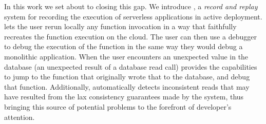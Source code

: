 In this work we set about to closing this gap. We introduce \system, a
\emph{record and replay} system for recording the execution of serverless
applications in active deployment. \system lets the user rerun locally any
function invocation in a way that faithfully recreates the function execution on
the cloud. The user can then use a debugger to debug the execution of the
function in the same way they would debug a monolithic application. When the
user encounters an unexpected value in the database (an unexpected result of a
database read call) \system provides the capabilities to jump to the function
that originally wrote that to the database, and debug that function.
Additionally, \system automatically detects inconsistent reads that may have
resulted from the lax consistency guarantees made by the system, thus bringing
this source of potential problems to the forefront of developer's attention.

